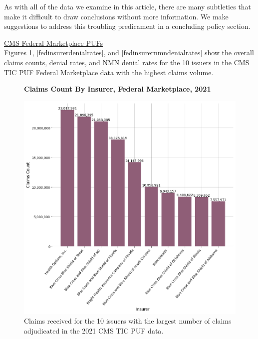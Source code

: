 \documentclass[12pt, a4paper,twoside]{report}
\theoremstyle{plain} %
\theoremstyle{definition} %
\theoremstyle{remark} %
\numberwithin{equation}{chapter}
\begin{document}
		As with all of the data we examine in this article, there are many subtleties that make it difficult to draw conclusions without more information. We make suggestions to address this troubling predicament in a concluding policy section.

		
		\underline{CMS Federal Marketplace PUFs}\\
		
		Figures \ref{fedinsurerclaims}, \ref{fedinsurerdenialrates}, and \ref{fedinsurernmndenialrates} show the overall claims counts, denial rates, and NMN denial rates for the 10 issuers in the CMS TIC PUF Federal Marketplace data with the highest claims volume.
		
		
		\begin{figure}[h!]
			\centering
			\textbf{Claims Count By Insurer, Federal Marketplace, 2021}\par\medskip
			\includegraphics[width=\columnwidth]{images/cms_puf/claims_by_insurer.png}
			\caption{Claims received for the 10 issuers with the largest number of claims adjudicated in the 2021 CMS TIC PUF data.}
			\label{fedinsurerclaims}
		\end{figure}
	
		\clearpage
	
\end{document}
